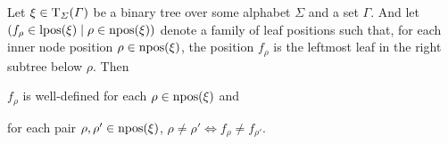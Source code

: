 \documentclass[../document.tex]{subfiles}
\begin{document}
    \begin{lemma}\label{lem:firstviasecond}
        Let \(\xi \in \operatorname{T}_{\varSigma}(\varGamma)\) be a binary tree over some alphabet \(\varSigma\) and a set \(\varGamma\).
        And let \((f_\rho \in \operatorname{lpos}(\xi) \mid \rho \in \operatorname{npos}(\xi))\) denote a family of leaf positions such that, for each inner node position \(\rho \in \operatorname{npos}(\xi)\), the position \(f_\rho\) is the leftmost leaf in the right subtree below \(\rho\).
        Then
        \begin{inparaenum}
            \item \(f_\rho\) is well-defined for each \(\rho \in \operatorname{npos}(\xi)\) and
            \item for each pair \(\rho, \rho' \in \operatorname{npos}(\xi)\), \(\rho \neq \rho' \iff f_\rho \neq f_{\rho'}\).
        \end{inparaenum}
    \end{lemma}

\end{document}
